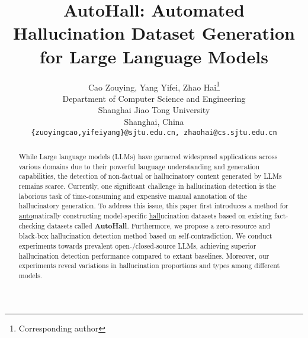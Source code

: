\documentclass{article} %
\title{AutoHall: Automated Hallucination Dataset Generation for Large Language Models}
\author{Cao Zouying, Yang Yifei, Zhao Hai\thanks{Corresponding author}\\
Department of Computer Science and Engineering\\
Shanghai Jiao Tong University\\
Shanghai, China \\
\texttt{\{zuoyingcao,yifeiyang\}@sjtu.edu.cn, zhaohai@cs.sjtu.edu.cn} 
}
\date{}
\begin{document}
\maketitle

\begin{abstract}



While Large language models (LLMs) have garnered widespread applications across various domains due to their powerful language understanding and generation capabilities, the detection of non-factual or hallucinatory content generated by LLMs remains scarce. Currently, one significant challenge in hallucination detection is the laborious task of time-consuming and expensive manual annotation of the hallucinatory generation. To address this issue, this paper first introduces a method for \underline{auto}matically constructing model-specific \underline{hall}ucination datasets based on existing fact-checking datasets called \textbf{AutoHall}. Furthermore, we propose a zero-resource and black-box hallucination detection method based on self-contradiction. We conduct experiments towards prevalent open-/closed-source LLMs, achieving superior hallucination detection performance compared to extant baselines. Moreover, our experiments reveal variations in hallucination proportions and types among different models.

\end{abstract}





\end{document}
